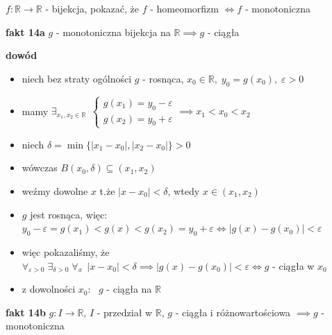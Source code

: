 \documentclass[a4paper,12pt]{article}
\begin{document}
\bigskip
{} \; \(f: \mathbb{R} \to \mathbb{R}\) - bijekcja, \; pokazać, że \(f\) - homeomorfizm \(\iff f\) - monotoniczna

\smallskip
\textbf{fakt 14a} \; \(g\) - monotoniczna bijekcja na \(\mathbb{R} \implies g\) - ciągła

\smallskip
\textbf{dowód}
\begin{itemize}
    \item niech bez straty ogólności \(g\) - rosnąca, \; \(x_0 \in \mathbb{R}, \; y_0 = g(x_0), \; \varepsilon > 0\)
    \item mamy \(\exists_{x_1, x_2 \in \mathbb{R}} \;\, \begin{cases} g(x_1) = y_0 - \varepsilon \\ g(x_2) = y_0 + \varepsilon \end{cases} \implies x_1 < x_0 < x_2\)
    \item niech \(\delta = \min\{|x_1 - x_0|, |x_2 - x_0|\} > 0\)
    \item wówczas \(B(x_0, \delta) \subseteq (x_1, x_2)\)
    \item weźmy dowolne \(x\) t.że \(|x - x_0| < \delta\), wtedy \(x \in (x_1, x_2)\)
    \item \(g\) jest rosnąca, więc: \, \(y_0 - \varepsilon = g(x_1) < g(x) < g(x_2) = y_0 + \varepsilon \iff |g(x) - g(x_0)| < \varepsilon\)
    \item więc pokazaliśmy, że \(\forall_{\varepsilon > 0} \; \exists_{\delta > 0} \; \forall_x \;\, |x - x_0| < \delta \implies |g(x) - g(x_0)| < \varepsilon \iff g\) - ciągła w \(x_0\)
    \item z dowolności \(x_0\): \, \(g\) - ciągła na \(\mathbb{R}\)
\end{itemize}

\bigskip
\textbf{fakt 14b} \; \(g: I \to \mathbb{R}\), \; \(I\) - przedział w \(\mathbb{R}\), \; \(g\) - ciągła i różnowartościowa \(\implies g\) - monotoniczna
\end{document}
